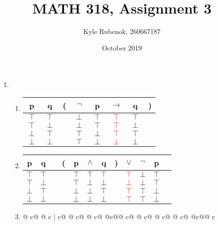 \documentclass{article}
\title{MATH 318, Assignment 3}
\author{Kyle Rubenok, 260667187}
\date{October 2019}
\begin{document}
\maketitle

    \begin{enumerate}
        \item 
            \begin{enumerate}
                \item
                    \begin{tabular}{ c  c | c  c  c  c  c  c }
                    p & q & ( & $\neg$ & p & $\rightarrow$ & q & )\\
                    \hline 
                    $\top$ & $\top$ &  & $\perp$ & $\top$ & \textcolor{red}{$\top$} & $\top$ & \\
                    $\top$ & $\perp$ &  & $\perp$ & $\top$ & \textcolor{red}{$\top$} & $\perp$ & \\
                    $\perp$ & $\top$ &  & $\top$ & $\perp$ & \textcolor{red}{$\top$} & $\top$ & \\
                    $\perp$ & $\perp$ &  & $\top$ & $\perp$ & \textcolor{red}{$\perp$} & $\perp$ & \\
                    \end{tabular}
                \item
                    \begin{tabular}{@{ }c@{ }@{ }c | c@{ }@{}c@{}@{ }c@{ }@{ }c@{ }@{ }c@{ }@{}c@{}@{ }c@{ }    @{ }c@{ }@{ }c@{ }@{ }c} p & q &  & ( & p & $\land$ & q & ) & $\lor$ & $\neg$ & p & \\
                    \hline 
                    $\top$ & $\top$ &  &  & $\top$ & $\top$ & $\top$ &  & \textcolor{red}{$\top$} & $\bot$ &     $\top$ & \\
                    $\top$ & $\bot$ &  &  & $\top$ & $\bot$ & $\bot$ &  & \textcolor{red}{$\bot$} & $\bot$ &     $\top$ & \\
                    $\bot$ & $\top$ &  &  & $\bot$ & $\bot$ & $\top$ &  & \textcolor{red}{$\top$} & $\top$ &     $\bot$ & \\
                    $\bot$ & $\bot$ &  &  & $\bot$ & $\bot$ & $\bot$ &  & \textcolor{red}{$\top$} & $\top$ &     $\bot$ & \\
                    \end{tabular}
                \item
                    \begin{tabular}{@{ }c@{ }@{ }c | c@{ }@{ }c@{ }@{ }c@{ }@{}c@{}@{ }c@{ }@{ }c@{ }@{ }c@ { }@{ }c@{ }@{}c@{}@{ }c}

\end{tabular}
\end{enumerate}
\end{enumerate}
\end{document}
